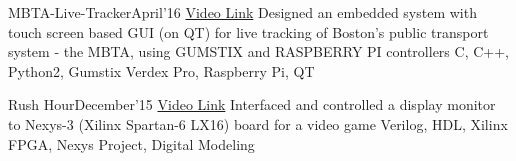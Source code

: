\begin{projects}
	\project
	{MBTA-Live-Tracker}{April'16}
	{ \href{https://www.youtube.com/watch?v=DtY4qqCeVRI}{\faYoutube Video Link}}
	{Designed an embedded system with touch screen based GUI (on QT) for live tracking of Boston’s public transport system - the MBTA, using GUMSTIX and RASPBERRY PI controllers}
	{C, C++, Python2, Gumstix Verdex Pro, Raspberry Pi, QT }

	\project
	{Rush Hour}{December'15}
	{ \href{https://youtu.be/s36H25OkzVQ}{\faYoutube Video Link}}
	{Interfaced and controlled a display monitor to Nexys-3 (Xilinx Spartan-6 LX16) board for a video game}
	{Verilog, HDL, Xilinx FPGA, Nexys Project, Digital Modeling}
\end{projects}

